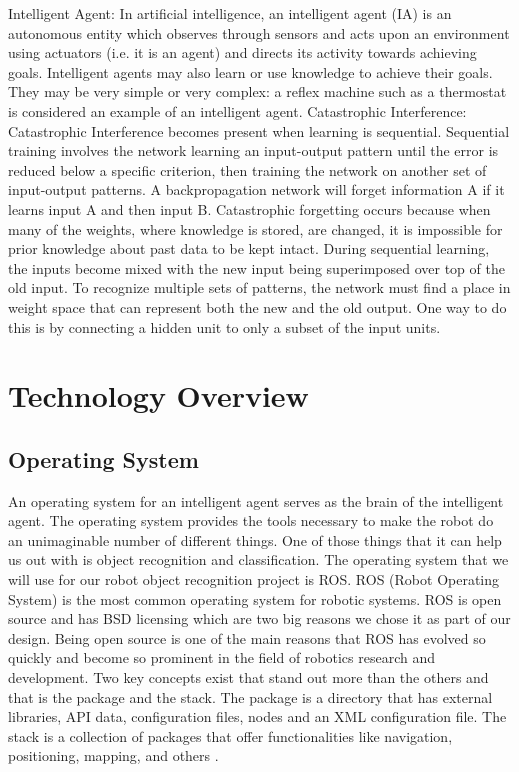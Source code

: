 \documentclass[draftclsnofoot, onecolumn, 10pt, compsoc]{IEEEtran}
\begin{document}
\newline \newline
Intelligent Agent: In artificial intelligence, an intelligent agent (IA) is an autonomous entity which observes through sensors and acts upon an environment using actuators (i.e. it is an agent) and directs its activity towards achieving goals. Intelligent agents may also learn or use knowledge to achieve their goals. They may be very simple or very complex: a reflex machine such as a thermostat is considered an example of an intelligent agent.
\cite{Norvig}
\newline \newline
Catastrophic Interference: Catastrophic Interference becomes present when learning is sequential. Sequential training involves the network learning an input-output pattern until the error is reduced below a specific criterion, then training the network on another set of input-output patterns. A backpropagation network will forget information A if it learns input A and then input B. Catastrophic forgetting occurs because when many of the weights, where knowledge is stored, are changed, it is impossible for prior knowledge about past data to be kept intact. During sequential learning, the inputs become mixed with the new input being superimposed over top of the old input. To recognize multiple sets of patterns, the network must find a place in weight space that can represent both the new and the old output. One way to do this is by connecting a hidden unit to only a subset of the input units. \cite{ImgRecog}
\cite{miller}

\section{Technology Overview}

\subsection{Operating System}
An operating system for an intelligent agent serves as the brain of the intelligent agent. The operating system provides the tools necessary to make the robot do an unimaginable number of different things. One of those things that it can help us out with is object recognition and classification. The operating system that we will use for our robot object recognition project is ROS. ROS (Robot Operating System) is the most common operating system for robotic systems. ROS is open source and has BSD licensing which are two big reasons we chose it as part of our design. Being open source is one of the main reasons that ROS has evolved so quickly and become so prominent in the field of robotics research and development. Two key concepts exist that stand out more than the others and that is the package and the stack. The package is a directory that has external libraries, API data, configuration files, nodes and an XML configuration file. The stack is a collection of packages that offer functionalities like navigation, positioning, mapping, and others \cite{ROSintro}.
\end{document}
